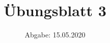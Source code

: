 

\subject{Computational Physics}
\title{Übungsblatt 3}
\date{%
  Abgabe: 15.05.2020
}



\maketitle
\thispagestyle{empty}
\newpage








